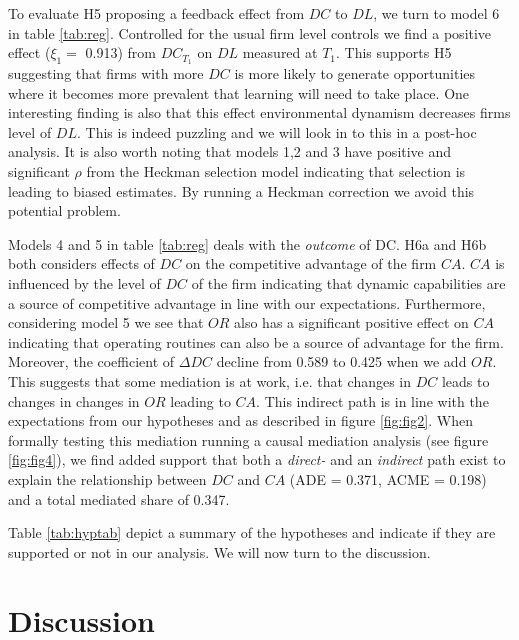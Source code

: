 \documentclass[review,fleqn]{elsarticle}\usepackage[]{graphicx}\usepackage[]{color}
\begin{document}
To evaluate H5 proposing a feedback effect from $DC$ to $DL$, we turn to model 6 in table
\ref{tab:reg}. Controlled for the usual firm level controls we find a positive effect
($\xi_1=$ 0.913) from $DC_{T_1}$ on $DL$ measured at $T_1$. This supports H5
suggesting that firms with more $DC$ is more likely to generate opportunities where it
becomes more prevalent that learning will need to take place. One interesting finding is
also that this effect environmental dynamism decreases firms level of $DL$. This is indeed
puzzling and we will look in to this in a post-hoc analysis. It is also worth noting that models 1,2 and 3 have positive
and significant $\rho$ from the Heckman selection model indicating that selection is
leading to biased estimates. By running a Heckman correction we avoid this potential
problem.

Models 4 and 5 in table \ref{tab:reg} deals with the \emph{outcome} of DC. H6a and H6b
both considers effects of $DC$ on the competitive advantage of the firm $CA$. $CA$ is
influenced by the level of $DC$ of the firm indicating that dynamic capabilities are a
source of competitive advantage in line with our expectations. Furthermore, considering
model 5 we see that $OR$ also has a significant positive effect on $CA$ indicating that
operating routines can also be a source of advantage for the firm. Moreover, the
coefficient of $\Delta DC$ decline from 0.589 to 0.425 when we add
$OR$. This suggests that some mediation is at work, i.e. that changes in $DC$ leads to
changes in changes in $OR$ leading to $CA$. This indirect path is in line with the
expectations from our hypotheses and as described in figure \ref{fig:fig2}. When formally
testing this mediation running a causal mediation analysis (see figure \ref{fig:fig4}), we
find added support that both a \emph{direct-} and an \emph{indirect} path exist to explain
the relationship between $DC$ and $CA$ (ADE = 0.371, ACME =
0.198) and a total mediated share of 0.347.

Table \ref{tab:hyptab} depict a summary of the hypotheses and indicate if they are
supported or not in our analysis. We will now turn to the discussion. 



\section{Discussion}
\end{document}
